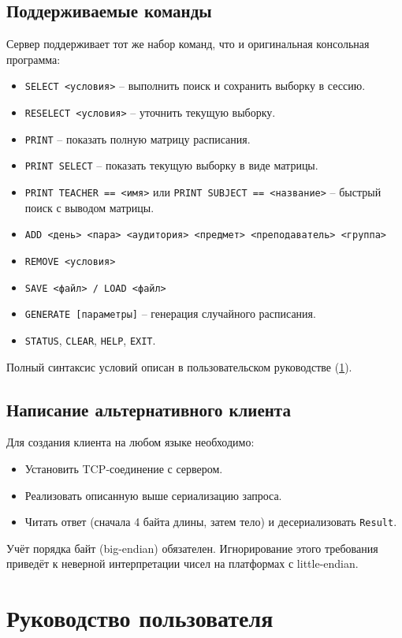 \documentclass[12pt,a4paper]{article}
\begin{document}
\subsection{Поддерживаемые команды}
Сервер поддерживает тот же набор команд, что и оригинальная консольная программа:
\begin{itemize}
  \item \texttt{SELECT <условия>} – выполнить поиск и сохранить выборку в сессию.
  \item \texttt{RESELECT <условия>} – уточнить текущую выборку.
  \item \texttt{PRINT} – показать полную матрицу расписания.
  \item \texttt{PRINT SELECT} – показать текущую выборку в виде матрицы.
  \item \texttt{PRINT TEACHER == <имя>} или \texttt{PRINT SUBJECT == <название>} – быстрый поиск с выводом матрицы.
  \item \texttt{ADD <день> <пара> <аудитория> <предмет> <преподаватель> <группа>}
  \item \texttt{REMOVE <условия>}
  \item \texttt{SAVE <файл> / LOAD <файл>}
  \item \texttt{GENERATE [параметры]} – генерация случайного расписания.
  \item \texttt{STATUS}, \texttt{CLEAR}, \texttt{HELP}, \texttt{EXIT}.
\end{itemize}
Полный синтаксис условий описан в пользовательском руководстве (\ref{sec:user}).

\subsection{Написание альтернативного клиента}
Для создания клиента на любом языке необходимо:
\begin{itemize}
  \item Установить TCP‑соединение с сервером.
  \item Реализовать описанную выше сериализацию запроса.
  \item Читать ответ (сначала 4 байта длины, затем тело) и десериализовать \texttt{Result}.
\end{itemize}
Учёт порядка байт (big-endian) обязателен. Игнорирование этого требования приведёт к неверной интерпретации чисел на платформах с little-endian.

\section{Руководство пользователя}
\label{sec:user}
\end{document}
